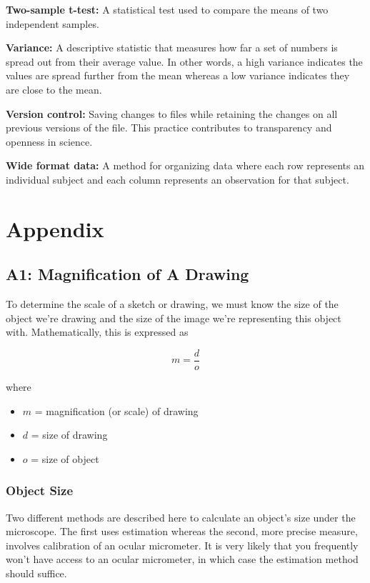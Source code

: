 \documentclass[
]{book}
\providecommand{\tightlist}{%
  \setlength{\itemsep}{0pt}\setlength{\parskip}{0pt}}
\begin{document}
\textbf{Two-sample t-test:} A statistical test used to compare the means of two independent samples.

\textbf{Variance:} A descriptive statistic that measures how far a set of numbers is spread out from their average value. In other words, a high variance indicates the values are spread further from the mean whereas a low variance indicates they are close to the mean.

\textbf{Version control:} Saving changes to files while retaining the changes on all previous versions of the file. This practice contributes to transparency and openness in science.

\textbf{Wide format data:} A method for organizing data where each row represents an individual subject and each column represents an observation for that subject.

\hypertarget{part-appendix}{%
\part*{Appendix}\label{part-appendix}}

\hypertarget{a1-magnification-of-a-drawing}{%
\chapter*{A1: Magnification of A Drawing}\label{a1-magnification-of-a-drawing}}

To determine the scale of a sketch or drawing, we must know the size of the object we're drawing and the size of the image we're representing this object with. Mathematically, this is expressed as

\[m = \frac{d}{o}\]

where

\begin{itemize}
\tightlist
\item
  \(m\) = magnification (or scale) of drawing
\item
  \(d\) = size of drawing
\item
  \(o\) = size of object
\end{itemize}

\hypertarget{object-size}{%
\section{Object Size}\label{object-size}}

Two different methods are described here to calculate an object's size under the microscope. The first uses estimation whereas the second, more precise measure, involves calibration of an ocular micrometer. It is very likely that you frequently won't have access to an ocular micrometer, in which case the estimation method should suffice.
\end{document}

